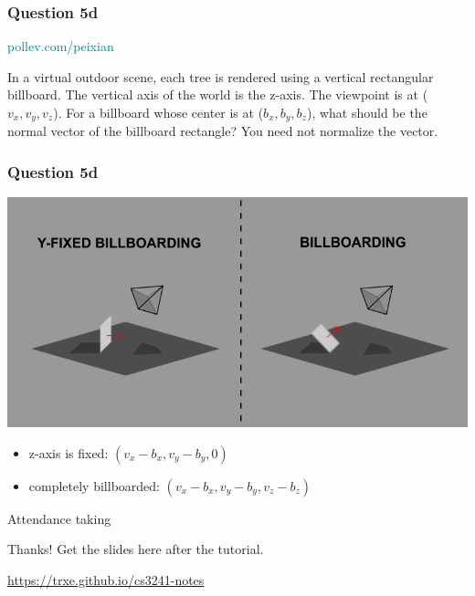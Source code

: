 \documentclass{beamer}
\begin{document}
\begin{frame}
    \frametitle{Question 5d}

    \begin{tcolorbox}[colback=teal!5!white]
        \textcolor{teal}{pollev.com/peixian}
    \end{tcolorbox}

    In a virtual outdoor scene, each tree is rendered using a vertical rectangular billboard. 
    The vertical axis of the world is the z-axis. The viewpoint is at ($v_x, v_y, v_z$). 
    For a billboard whose center is at ($b_x, b_y, b_z$), what should be the normal vector of the billboard rectangle? 
    You need not normalize the vector.

\end{frame}

\begin{frame}
    \frametitle{Question 5d}

    \begin{center}
        \includegraphics[scale=0.35]{billboarding.png}
    \end{center}

    \begin{tcolorbox}
        \begin{itemize}
            \item z-axis is fixed: $(v_x - b_x, v_y - b_y, 0)$
            \item completely billboarded: $(v_x - b_x, v_y - b_y, v_z - b_z)$
        \end{itemize}
    \end{tcolorbox}

\end{frame}

\begin{frame}
    \AlegreyaExtraBold \LARGE
    Attendance taking
\end{frame}

\ThankYou
\begin{frame}
    Thanks! Get the slides here after the tutorial.\\
    \vspace{2em}
    \scalebox{3}{\faGithub}\par\bigskip
    \url{https://trxe.github.io/cs3241-notes}
\end{frame}
\end{document}
